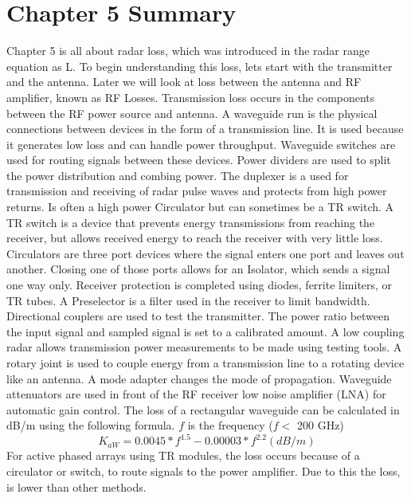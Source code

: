 \documentclass[12pt]{article}
\begin{document}
\section{Chapter 5 Summary}
Chapter 5 is all about radar loss, which was introduced in the radar range equation as L. To begin understanding this loss, lets start with the transmitter and the antenna. Later we will look at loss between the antenna and RF amplifier, known as RF Losses. 
Transmission loss occurs in the components between the RF power source and antenna. A waveguide run is the physical connections between devices in the form of a transmission line. It is used because it generates low loss and can handle power throughput. Waveguide switches are used for routing signals between these devices. Power dividers are used to split the power distribution and combing power. The duplexer is a used for transmission and receiving of radar pulse waves and protects from high power returns. Is often a high power Circulator but can sometimes be a TR switch. A TR switch is a device that prevents energy transmissions from reaching the receiver, but allows received energy to reach the receiver with very little loss. 
Circulators are three port devices where the signal enters one port and leaves out another. Closing one of those ports allows for an Isolator, which sends a signal one way only. Receiver protection is completed using diodes, ferrite limiters, or TR tubes. A Preselector is a filter used in the receiver to limit bandwidth. Directional couplers are used to test the transmitter. The power ratio between the input signal and sampled signal is set to a calibrated amount. A low coupling radar allows transmission power measurements to be made using testing tools. 
A rotary joint is used to couple energy from a transmission line to a rotating device like an antenna. A mode adapter changes the mode of propagation. Waveguide attenuators are used in front of the RF receiver low noise amplifier (LNA) for automatic gain control. 
The loss of a rectangular waveguide can be calculated in dB/m using the following formula. $f$ is the frequency ($f<$ 200 GHz)
\begin{equation}
    K_{aW} = 0.0045 * f^{1.5} -0.00003 * f^{2.2} (dB/m)
\end{equation}
For active phased arrays using TR modules, the loss occurs because of a circulator or switch, to route signals to the power amplifier. Due to this the loss, is lower than other methods. 
\end{document}
